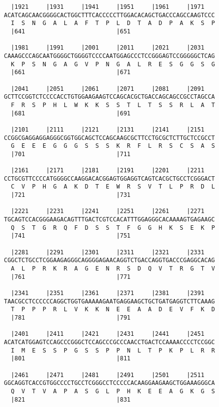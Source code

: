 \documentclass{article}
\begin{document}
\begin{Verbatim}
  |1921     |1931     |1941     |1951     |1961     |1971   
ACATCAGCAACGGGGCACTGGCTTTCACCCCCTTGGACACAGCTGACCCAGCCAAGTCCC
  I  S  N  G  A  L  A  F  T  P  L  D  T  A  D  P  A  K  S  P
  |641                          |651                        
  
  |1981     |1991     |2001     |2011     |2021     |2031   
CAAAGCCCAGCAATGGGGCTGGGGTCCCCAATGGAGCCCTCCGGGAGTCCGGGGGCTCAG
  K  P  S  N  G  A  G  V  P  N  G  A  L  R  E  S  G  G  S  G
  |661                          |671                        
  
  |2041     |2051     |2061     |2071     |2081     |2091   
GCTTCCGGTCTCCCCACCTGTGGAAGAAGTCCAGCACGCTGACCAGCAGCCGCCTAGCCA
  F  R  S  P  H  L  W  K  K  S  S  T  L  T  S  S  R  L  A  T
  |681                          |691                        
  
  |2101     |2111     |2121     |2131     |2141     |2151   
CCGGCGAGGAGGAGGGCGGTGGCAGCTCCAGCAAGCGCTTCCTGCGCTCTTGCTCCGCCT
  G  E  E  E  G  G  G  S  S  S  K  R  F  L  R  S  C  S  A  S
  |701                          |711                        
  
  |2161     |2171     |2181     |2191     |2201     |2211   
CCTGCGTTCCCCATGGGGCCAAGGACACGGAGTGGAGGTCAGTCACGCTGCCTCGGGACT
  C  V  P  H  G  A  K  D  T  E  W  R  S  V  T  L  P  R  D  L
  |721                          |731                        
  
  |2221     |2231     |2241     |2251     |2261     |2271   
TGCAGTCCACGGGAAGACAGTTTGACTCGTCCACATTTGGAGGGCACAAAAGTGAGAAGC
  Q  S  T  G  R  Q  F  D  S  S  T  F  G  G  H  K  S  E  K  P
  |741                          |751                        
  
  |2281     |2291     |2301     |2311     |2321     |2331   
CGGCTCTGCCTCGGAAGAGGGCAGGGGAGAACAGGTCTGACCAGGTGACCCGAGGCACAG
  A  L  P  R  K  R  A  G  E  N  R  S  D  Q  V  T  R  G  T  V
  |761                          |771                        
  
  |2341     |2351     |2361     |2371     |2381     |2391   
TAACGCCTCCCCCCAGGCTGGTGAAAAAGAATGAGGAAGCTGCTGATGAGGTCTTCAAAG
  T  P  P  P  R  L  V  K  K  N  E  E  A  A  D  E  V  F  K  D
  |781                          |791                        
  
  |2401     |2411     |2421     |2431     |2441     |2451   
ACATCATGGAGTCCAGCCCGGGCTCCAGCCCGCCCAACCTGACTCCAAAACCCCTCCGGC
  I  M  E  S  S  P  G  S  S  P  P  N  L  T  P  K  P  L  R  R
  |801                          |811                        
  
  |2461     |2471     |2481     |2491     |2501     |2511   
GGCAGGTCACCGTGGCCCCTGCCTCGGGCCTCCCCCACAAGGAAGAAGCTGGAAAGGGCA
  Q  V  T  V  A  P  A  S  G  L  P  H  K  E  E  A  G  K  G  S
  |821                          |831                        
  

\end{Verbatim}
\end{document}
